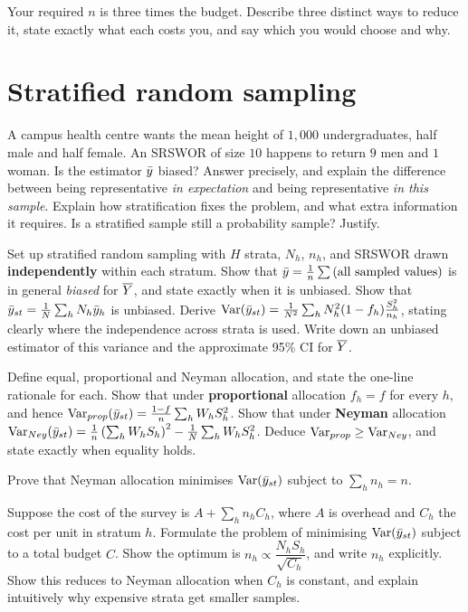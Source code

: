 Your required $n$ is three times the budget. Describe three distinct ways to reduce it, state
exactly what each costs you, and say which you would choose and why.

\section{Stratified random sampling}

A campus health centre wants the mean height of $1{,}000$ undergraduates, half male and half
female. An SRSWOR of size $10$ happens to return $9$ men and $1$ woman.
 Is the estimator $\bar{y}$ biased? Answer precisely, and explain the difference between
being representative \emph{in expectation} and being representative \emph{in this sample}.
 Explain how stratification fixes the problem, and what extra information it requires.
 Is a stratified sample still a probability sample? Justify.

Set up stratified random sampling with $H$ strata, $N_h$, $n_h$, and SRSWOR drawn
\textbf{independently} within each stratum.
 Show that $\bar{y}=\frac1n\sum\text{(all sampled values)}$ is in general \emph{biased} for
$\overline{Y}$, and state exactly when it is unbiased.
 Show that $\bar{y}_{st}=\frac1N\sum_hN_h\bar{y}_h$ is unbiased.
 Derive $\operatorname{Var}(\bar{y}_{st})=\frac1{N^2}\sum_hN_h^2(1-f_h)\frac{S_h^2}{n_h}$, stating clearly
where the independence across strata is used.
 Write down an unbiased estimator of this variance and the approximate 95\% CI for $\overline{Y}$.

 Define equal, proportional and Neyman allocation, and state the one-line rationale for
each.
 Show that under \textbf{proportional} allocation $f_h=f$ for every $h$, and hence
$\operatorname{Var}_{prop}(\bar{y}_{st})=\frac{1-f}{n}\sum_hW_hS_h^2$.
 Show that under \textbf{Neyman} allocation
$\operatorname{Var}_{Ney}(\bar{y}_{st})=\frac{1}{n}\left(\sum_hW_hS_h\right)^2-\frac1N\sum_hW_hS_h^2$.
 Deduce $\operatorname{Var}_{prop}\ge\operatorname{Var}_{Ney}$, and state exactly when equality holds.

Prove that Neyman allocation minimises $\operatorname{Var}(\bar{y}_{st})$ subject to $\sum_hn_h=n$.

Suppose the cost of the survey is $A+\sum_hn_hC_h$, where $A$ is overhead and $C_h$ the cost per
unit in stratum $h$.
 Formulate the problem of minimising $\operatorname{Var}(\bar{y}_{st})$ subject to a total budget $C$.
 Show the optimum is $n_h\propto\dfrac{N_hS_h}{\sqrt{C_h}}$, and write $n_h$ explicitly.
 Show this reduces to Neyman allocation when $C_h$ is constant, and explain intuitively why
expensive strata get smaller samples.

